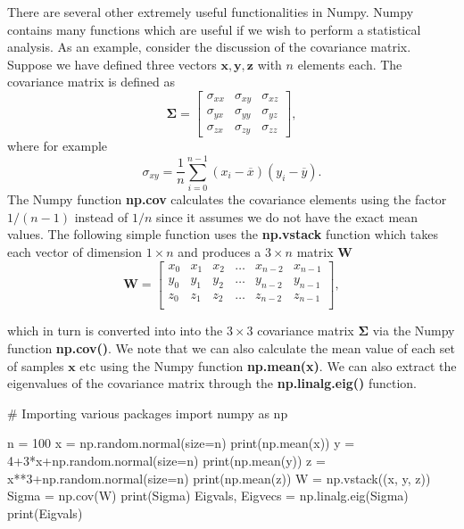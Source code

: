 \documentclass[%
oneside,                 %
final,                   %
10pt]{article}
\begin{document}
There are several other extremely useful functionalities in Numpy. Numpy contains many functions which are useful if we wish to perform a statistical analysis.
As an example, consider the discussion of the covariance matrix. Suppose we have defined three vectors
$\bm{x}, \bm{y}, \bm{z}$ with $n$ elements each. The covariance matrix is defined as 
\[
\bm{\Sigma} = \begin{bmatrix} \sigma_{xx} & \sigma_{xy} & \sigma_{xz} \\
                              \sigma_{yx} & \sigma_{yy} & \sigma_{yz} \\
                              \sigma_{zx} & \sigma_{zy} & \sigma_{zz} 
             \end{bmatrix},
\]
where for example
\[
\sigma_{xy} =\frac{1}{n} \sum_{i=0}^{n-1}(x_i- \overline{x})(y_i- \overline{y}).
\]
The Numpy function \textbf{np.cov} calculates the covariance elements using the factor $1/(n-1)$ instead of $1/n$ since it assumes we do not have the exact mean values. 
The following simple function uses the \textbf{np.vstack} function which takes each vector of dimension $1\times n$ and produces a $3\times n$ matrix $\bm{W}$
\[
\bm{W} = \begin{bmatrix} x_0 & x_1 & x_2 & \dots & x_{n-2} & x_{n-1} \\
                         y_0 & y_1 & y_2 & \dots & y_{n-2} & y_{n-1} \\
			 z_0 & z_1 & z_2 & \dots & z_{n-2} & z_{n-1} \\
             \end{bmatrix},
\]

which in turn is converted into into the $3\times 3$ covariance matrix
$\bm{\Sigma}$ via the Numpy function \textbf{np.cov()}. We note that we can also calculate
the mean value of each set of samples $\bm{x}$ etc using the Numpy
function \textbf{np.mean(x)}. We can also extract the eigenvalues of the
covariance matrix through the \textbf{np.linalg.eig()} function.

















\bpycod
# Importing various packages
import numpy as np

n = 100
x = np.random.normal(size=n)
print(np.mean(x))
y = 4+3*x+np.random.normal(size=n)
print(np.mean(y))
z = x**3+np.random.normal(size=n)
print(np.mean(z))
W = np.vstack((x, y, z))
Sigma = np.cov(W)
print(Sigma)
Eigvals, Eigvecs = np.linalg.eig(Sigma)
print(Eigvals)
\end{document}
